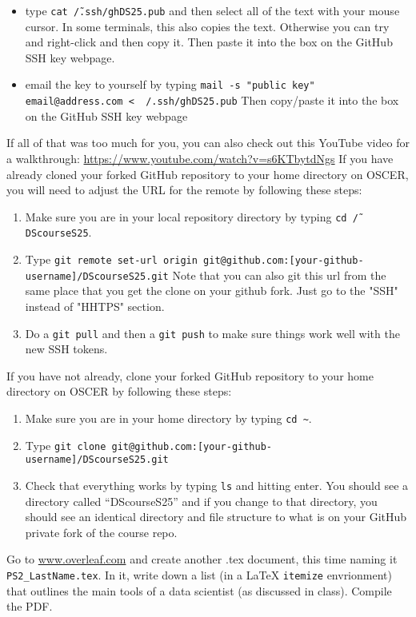 \documentclass[12pt,english]{exam}
\begin{document}
\begin{questions}
\begin{enumerate}
\begin{itemize}
        \item type \texttt{cat \~/.ssh/ghDS25.pub} and then select all of the text with your mouse cursor. In some terminals, this also copies the text. Otherwise you can try and right-click and then copy it. Then paste it into the box on the GitHub SSH key webpage.
        \item email the key to yourself by typing
        \texttt{mail -s "public key" email@address.com < ~/.ssh/ghDS25.pub}
        Then copy/paste it into the box on the GitHub SSH key webpage
    \end{itemize}
\end{enumerate}
    If all of that was too much for you, you can also check out this YouTube video for a walkthrough: \url{https://www.youtube.com/watch?v=s6KTbytdNgs}
\question If you have already cloned your forked GitHub repository to your home directory on OSCER, you will need to adjust the URL for the remote by following these steps:
\begin{enumerate}
    \item Make sure you are in your local repository directory by typing \texttt{cd \~/DScourseS25}.
    \item Type 
        \texttt{git remote set-url origin git@github.com:[your-github-username]/DScourseS25.git}
        Note that you can also git this url from the same place that you get the clone on your github fork. Just go to the "SSH" instead of "HHTPS" section.
    \item Do a \texttt{git pull} and then a \texttt{git push} to make sure things work well with the new SSH tokens.
\end{enumerate}
\question If you have not already, clone your forked GitHub repository to your home directory on OSCER by following these steps:
\begin{enumerate}
    \item Make sure you are in your home directory by typing \texttt{cd \~}.
    \item Type \texttt{git clone git@github.com:[your-github-username]/DScourseS25.git}
    \item Check that everything works by typing \texttt{ls} and hitting enter. You should see a directory called ``DScourseS25'' and if you change to that directory, you should see an identical directory and file structure to what is on your GitHub private fork of the course repo.
\end{enumerate}
\question Go to \url{www.overleaf.com} and create another .tex document, this time naming it \texttt{PS2\_LastName.tex}. In it, write down a list (in a LaTeX \texttt{itemize} envrionment) that outlines the main tools of a data scientist (as discussed in class). Compile the PDF.

\end{questions}
\end{document}
